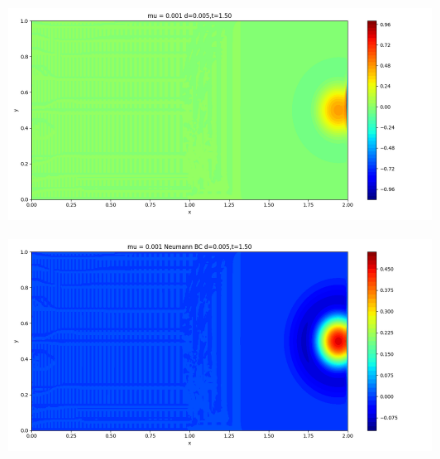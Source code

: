\documentclass[12pt]{article}
\begin{document}
\begin{figure}[H]
\begin{minipage}{\linewidth}
    \begin{minipage}{0.5\textwidth}
    \includegraphics[width=\linewidth]{figuresmu/mu3d0.005t1.50.png}
    \label{fig7}
    \end{minipage}\hfill
    \begin{minipage}{0.5\textwidth}
    \includegraphics[width=\linewidth]{figuresmu/mu3Nud0.005t1.50.png}
    \label{fig8}
    \end{minipage}
    \vspace{-1.5em}
    

\end{minipage}
\end{figure}
\end{document}
